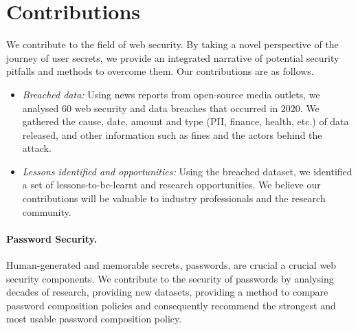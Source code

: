 \section{Contributions}
\label{chp1::sec::contributions}

We contribute to the field of web security. By taking a novel perspective of the journey of user secrets, we provide an integrated narrative of potential security pitfalls and methods to overcome them. Our contributions are as follows.

\begin{itemize}
\item \textit{Breached data:} Using news reports from open-source media outlets, we analysed 60 web security and data breaches that occurred in 2020. We gathered the cause, date, amount and type (PII, finance, health, etc.) of data released, and other information such as fines and the actors behind the attack.
  
\item \textit{Lessons identified and opportunities:} Using the breached dataset, we identified a set of lessons-to-be-learnt and research opportunities. We believe our contributions will be valuable to industry professionals and the research community.
\end{itemize}

\paragraph{Password Security.} Human-generated and memorable secrets, passwords, are crucial a crucial web security components. We contribute to the security of passwords by analysing decades of research, providing new datasets, providing a method to compare password composition policies and consequently recommend the strongest and most usable password composition policy. 

